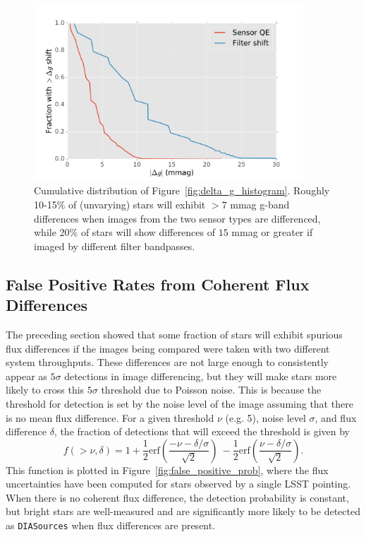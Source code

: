 \documentclass[12pt]{article}
\newcommand{\code}[1]{\texttt{#1}}
\newcommand{\DIASources}{\code{DIASources}\xspace}
\begin{document}
\begin{figure}
\includegraphics[width=0.9\textwidth]{figures/delta_g_cumulative.pdf}
\caption{Cumulative distribution of Figure~\ref{fig:delta_g_histogram}. Roughly
10-15\% of (unvarying) stars will exhibit $>7$ mmag g-band differences when
images from the two sensor types are differenced, while 20\% of stars will show
differences of $15$ mmag or greater if imaged by different filter bandpasses.
\label{fig:delta_g_cumulative}}
\end{figure}


\subsection{False Positive Rates from Coherent Flux Differences}

The preceding section showed that some fraction of stars will exhibit spurious
flux differences if the images being compared were taken with two different
system throughputs. These differences are not large enough to consistently
appear as $5\sigma$ detections in image differencing, but they will make stars
more likely to cross this $5\sigma$ threshold due to Poisson noise. This is
because the threshold for detection is set by the noise level of the image
assuming that there is no mean flux difference. For a given threshold $\nu$
(e.g. 5), noise level $\sigma$, and flux difference $\delta$, the fraction of
detections that will exceed the threshold is given by
%
\begin{equation}
  f( > \nu, \delta) = 1 + \frac{1}{2}\textrm{erf}\left( \frac{-\nu - \delta/\sigma}{\sqrt{2}}\right) \
  - \frac{1}{2}\textrm{erf}\left( \frac{\nu - \delta/\sigma}{\sqrt{2}}\right).
\end{equation}
%
This function is plotted in Figure~\ref{fig:false_positive_prob}, where the flux
uncertainties have been computed for stars observed by a single LSST pointing.
When there is no coherent flux difference, the detection probability is
constant, but bright stars are well-measured and are significantly more likely
to be detected as \DIASources when flux differences are present.
\end{document}
